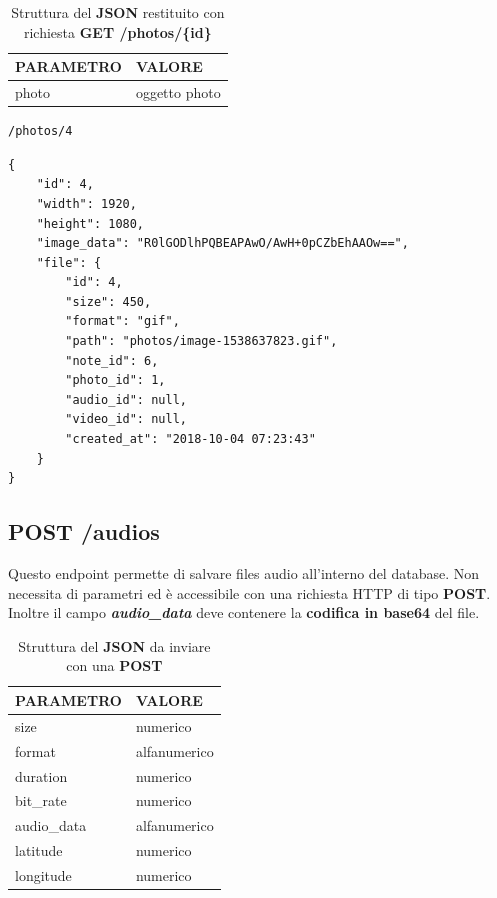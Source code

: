 \begin{table}[!h]
	\centering
	\begin{tabular}{@{}ll@{}}
		\toprule
		\textbf{PARAMETRO} & \textbf{VALORE}  \\ \midrule
		photo              & oggetto photo \\ \bottomrule
	\end{tabular}
\caption{Struttura del \textbf{JSON} restituito con richiesta \textbf{GET /photos/\{id\}}}
\end{table}

\begin{lstlisting}[caption=Esempio di richiesta \textbf{GET}, xleftmargin=.30\textwidth, xrightmargin=.30\textwidth]
	/photos/4
\end{lstlisting}

\begin{lstlisting}[caption=Esempio \textbf{JSON} restituito con richiesta \textbf{GET /photos/\{id\}}]
{
	"id": 4,
	"width": 1920,
	"height": 1080,
	"image_data": "R0lGODlhPQBEAPAwO/AwH+0pCZbEhAAOw==",
	"file": {
		"id": 4,
		"size": 450,
		"format": "gif",
		"path": "photos/image-1538637823.gif",
		"note_id": 6,
		"photo_id": 1,
		"audio_id": null,
		"video_id": null,
		"created_at": "2018-10-04 07:23:43"
	}
}
\end{lstlisting}


\subsection{POST /audios}
Questo endpoint permette di salvare files audio all'interno del database. Non necessita di parametri ed è accessibile con una richiesta HTTP di tipo \textbf{POST}. Inoltre il campo \textit{\textbf{audio\_data}} deve contenere la \textbf{codifica in base64} del file.

\begin{table}[!h]
	\centering
	\begin{tabular}{@{}ll@{}}
		\toprule
		\textbf{PARAMETRO} & \textbf{VALORE}  \\ \midrule
		size               & numerico\\ 
		format             & alfanumerico\\
		duration           & numerico\\
		bit\_rate          & numerico\\
		audio\_data        & alfanumerico\\
		latitude           & numerico\\ 
		longitude          & numerico\\ \bottomrule		
	\end{tabular}
\caption{Struttura del \textbf{JSON} da inviare con una \textbf{POST}}
\end{table}

